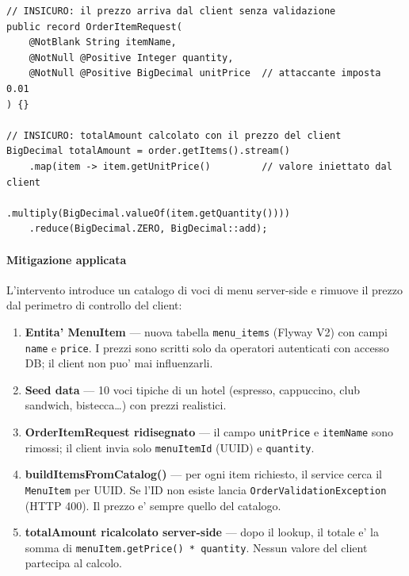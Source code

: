 ﻿\documentclass[a4paper,12pt]{report}
\begin{document}
\begin{insecurebox}[title={Codice Vulnerabile --- OrderItemRequest.java + service (baseline)}]
\begin{lstlisting}[style=java]
// INSICURO: il prezzo arriva dal client senza validazione
public record OrderItemRequest(
    @NotBlank String itemName,
    @NotNull @Positive Integer quantity,
    @NotNull @Positive BigDecimal unitPrice  // attaccante imposta 0.01
) {}

// INSICURO: totalAmount calcolato con il prezzo del client
BigDecimal totalAmount = order.getItems().stream()
    .map(item -> item.getUnitPrice()         // valore iniettato dal client
                     .multiply(BigDecimal.valueOf(item.getQuantity())))
    .reduce(BigDecimal.ZERO, BigDecimal::add);
\end{lstlisting}
\end{insecurebox}

\paragraph{Mitigazione applicata}
L'intervento introduce un catalogo di voci di menu server-side e rimuove
il prezzo dal perimetro di controllo del client:

\begin{enumerate}
    \item \textbf{Entita' MenuItem} --- nuova tabella \texttt{menu\_items}
          (Flyway V2) con campi \texttt{name} e \texttt{price}. I prezzi
          sono scritti solo da operatori autenticati con accesso DB;
          il client non puo' mai influenzarli.
    \item \textbf{Seed data} --- 10 voci tipiche di un hotel (espresso,
          cappuccino, club sandwich, bistecca\ldots) con prezzi realistici.
    \item \textbf{OrderItemRequest ridisegnato} --- il campo \texttt{unitPrice}
          e \texttt{itemName} sono rimossi; il client invia solo
          \texttt{menuItemId} (UUID) e \texttt{quantity}.
    \item \textbf{buildItemsFromCatalog()} --- per ogni item richiesto, il service
          cerca il \texttt{MenuItem} per UUID. Se l'ID non esiste lancia
          \texttt{OrderValidationException} (HTTP 400). Il prezzo e' sempre
          quello del catalogo.
    \item \textbf{totalAmount ricalcolato server-side} --- dopo il lookup, il
          totale e' la somma di \texttt{menuItem.getPrice() * quantity}.
          Nessun valore del client partecipa al calcolo.
\end{enumerate}
\end{document}

